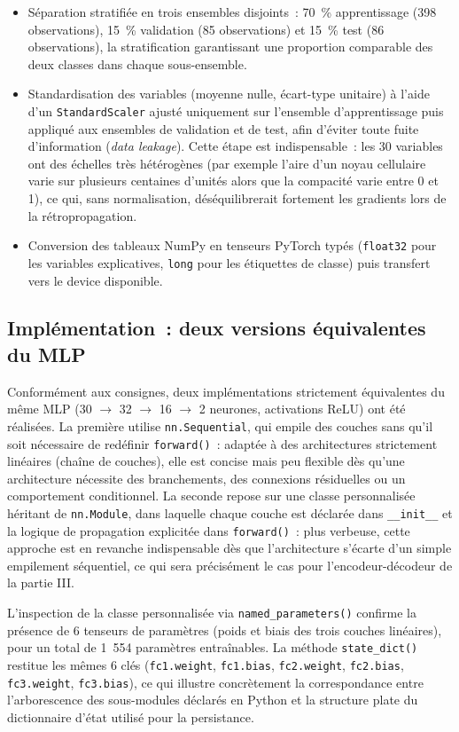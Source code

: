 \documentclass[11pt,a4paper]{article}
\begin{document}
\begin{itemize}[leftmargin=1.2cm]
\item Séparation stratifiée en trois ensembles disjoints~: 70~\% apprentissage (398 observations), 15~\% validation (85 observations) et 15~\% test (86 observations), la stratification garantissant une proportion comparable des deux classes dans chaque sous-ensemble.
\item Standardisation des variables (moyenne nulle, écart-type unitaire) à l'aide d'un \texttt{StandardScaler} ajusté uniquement sur l'ensemble d'apprentissage puis appliqué aux ensembles de validation et de test, afin d'éviter toute fuite d'information (\emph{data leakage}). Cette étape est indispensable~: les 30 variables ont des échelles très hétérogènes (par exemple l'aire d'un noyau cellulaire varie sur plusieurs centaines d'unités alors que la compacité varie entre 0 et 1), ce qui, sans normalisation, déséquilibrerait fortement les gradients lors de la rétropropagation.
\item Conversion des tableaux NumPy en tenseurs PyTorch typés (\texttt{float32} pour les variables explicatives, \texttt{long} pour les étiquettes de classe) puis transfert vers le device disponible.
\end{itemize}

\subsection{Implémentation~: deux versions équivalentes du MLP}

Conformément aux consignes, deux implémentations strictement équivalentes du même MLP (30 $\rightarrow$ 32 $\rightarrow$ 16 $\rightarrow$ 2 neurones, activations ReLU) ont été réalisées. La première utilise \texttt{nn.Sequential}, qui empile des couches sans qu'il soit nécessaire de redéfinir \texttt{forward()}~: adaptée à des architectures strictement linéaires (chaîne de couches), elle est concise mais peu flexible dès qu'une architecture nécessite des branchements, des connexions résiduelles ou un comportement conditionnel. La seconde repose sur une classe personnalisée héritant de \texttt{nn.Module}, dans laquelle chaque couche est déclarée dans \texttt{\_\_init\_\_} et la logique de propagation explicitée dans \texttt{forward()}~: plus verbeuse, cette approche est en revanche indispensable dès que l'architecture s'écarte d'un simple empilement séquentiel, ce qui sera précisément le cas pour l'encodeur-décodeur de la partie III.

L'inspection de la classe personnalisée via \texttt{named\_parameters()} confirme la présence de 6 tenseurs de paramètres (poids et biais des trois couches linéaires), pour un total de 1~554 paramètres entraînables. La méthode \texttt{state\_dict()} restitue les mêmes 6 clés (\texttt{fc1.weight}, \texttt{fc1.bias}, \texttt{fc2.weight}, \texttt{fc2.bias}, \texttt{fc3.weight}, \texttt{fc3.bias}), ce qui illustre concrètement la correspondance entre l'arborescence des sous-modules déclarés en Python et la structure plate du dictionnaire d'état utilisé pour la persistance.
\end{document}
